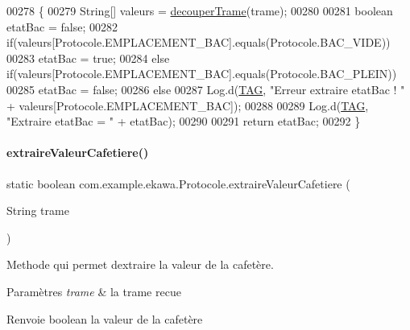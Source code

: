 \begin{DoxyCode}
00278     \{
00279         String[] valeurs = \hyperlink{classcom_1_1example_1_1ekawa_1_1_protocole_a23c261e4ab5ad3c2ac60187f04ae40ea}{decouperTrame}(trame);
00280 
00281         \textcolor{keywordtype}{boolean} etatBac = \textcolor{keyword}{false};
00282         \textcolor{keywordflow}{if}(valeurs[Protocole.EMPLACEMENT\_BAC].equals(Protocole.BAC\_VIDE))
00283             etatBac = \textcolor{keyword}{true};
00284         \textcolor{keywordflow}{else} \textcolor{keywordflow}{if}(valeurs[Protocole.EMPLACEMENT\_BAC].equals(Protocole.BAC\_PLEIN))
00285             etatBac = \textcolor{keyword}{false};
00286         \textcolor{keywordflow}{else}
00287             Log.d(\hyperlink{classcom_1_1example_1_1ekawa_1_1_protocole_ae9b68fa0daac528421b887f19413f8f5}{TAG}, \textcolor{stringliteral}{"Erreur extraire etatBac ! "} + valeurs[Protocole.EMPLACEMENT\_BAC]);
00288 
00289         Log.d(\hyperlink{classcom_1_1example_1_1ekawa_1_1_protocole_ae9b68fa0daac528421b887f19413f8f5}{TAG}, \textcolor{stringliteral}{"Extraire etatBac = "} + etatBac);
00290 
00291         \textcolor{keywordflow}{return} etatBac;
00292     \}
\end{DoxyCode}
\mbox{\label{classcom_1_1example_1_1ekawa_1_1_protocole_abc2f21c6245695c5037bd0a2eac88799}} 
\paragraph{\texorpdfstring{extraire\+Valeur\+Cafetiere()}{extraireValeurCafetiere()}}
{\footnotesize\ttfamily static boolean com.\+example.\+ekawa.\+Protocole.\+extraire\+Valeur\+Cafetiere (\begin{DoxyParamCaption}\item[{String}]{trame }\end{DoxyParamCaption})\hspace{0.3cm}{\ttfamily [static]}}



Methode qui permet d\textquotesingle{}extraire la valeur de la cafetère. 


\begin{DoxyParams}{Paramètres}
{\em trame} & la trame recue \\
\hline
\end{DoxyParams}
\begin{DoxyReturn}{Renvoie}
boolean la valeur de la cafetère 
\end{DoxyReturn}


